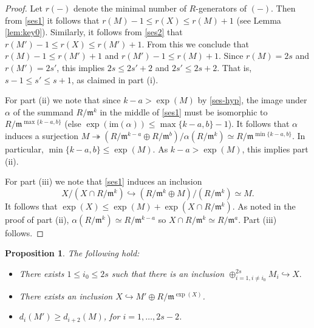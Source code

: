 \documentclass[10pt]{amsart}
\numberwithin{equation}{section}
\newtheorem{prop}[theorem]{Proposition}
\theoremstyle{definition}
\theoremstyle{remark}
\newcommand{\fm}{\mathfrak{m}}
\begin{document}
\begin{proof} Let $r(-)$ denote the minimal number of $R$-generators of $(-)$. Then from \eqref{ses1} it follows 
that $r(M) -1\leqslant r(X) \leqslant r(M)+1$ (see Lemma \ref{lem:key0}). 
Similarly, it follows from \eqref{ses2} that
$r(M')-1\leqslant r(X) \leqslant r(M')+1$. From this we conclude that $r(M)-1\leqslant r(M')+1$ and $r(M')-1\leqslant r(M)+1$. 
Since $r(M) = 2s$ and $r(M') = 2s'$, this implies $2s\leqslant 2s'+2$ and $2s'\leqslant 2s+2$. That is,
$s-1\leqslant s'\leqslant s+1$, as claimed in part (i).

For part (ii) we note that since $k-a>\exp(M)$ by \eqref{ses-hyp}, the image under $\alpha$ of the summand $R/\fm^k$ in the middle
of \eqref{ses1} must be isomorphic to $R/\fm^{\max\{k-a,b\}}$ (else $\exp(\mathrm{im}(\alpha))\leqslant \max\{k-a,b\}-1$). 
It follows that $\alpha$ induces a surjection $M\twoheadrightarrow (R/\fm^ {k-a}\oplus R/\fm^b)/\alpha(R/\fm^k) \simeq R/\fm^{\min\{k-a,b\}}$.
In particular, $\min\{k-a,b\}\leq \exp(M)$. As $k-a>\exp(M)$, this implies part (ii).

For part (iii) we note that \eqref{ses1} induces an inclusion
$$
X/(X\cap R/\fm^k) \hookrightarrow (R/\fm^k\oplus M)/(R/\fm^k) \simeq M.
$$
It follows that $\exp(X)\leqslant \exp(M) + \exp(X\cap R/\fm^k)$.  As noted in the proof of part (ii), $\alpha(R/\fm^k) \simeq R/\fm^{k-a}$
so $X\cap R/\fm^k \simeq R/\fm^a$. Part (iii) follows. 
\end{proof}




\begin{prop}\label{prop:key} The following hold:\hfill
\begin{itemize}
\item[(i)] There exists $1\leqslant i_0\leqslant 2s$ such that there is an inclusion
$\oplus_{i=1, i\neq i_0}^{2s} M_i \hookrightarrow X. $
\item[(ii)] There exists an inclusion $ X \hookrightarrow M'\oplus R/\fm^{\exp(X)}$.
\item[(iii)] $d_{i}(M') \geqslant  d_{i+2}(M)$, for $i=1,\dots,2s-2$.
\end{itemize}
\end{prop}
\end{document}
